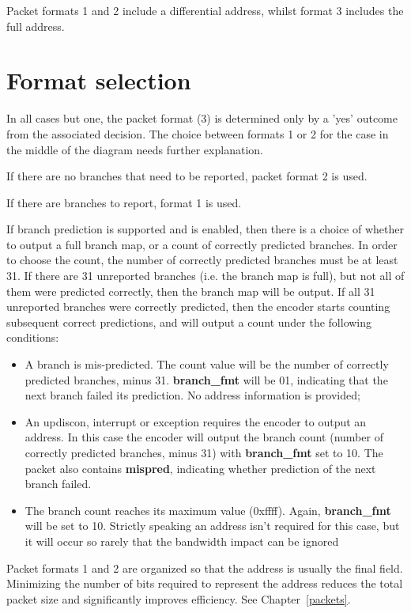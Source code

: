 Packet formats 1 and 2 include a differential address, whilst format 3 includes the full address.

\section{Format selection} \label{format-selection}

In all cases but one, the packet format (3) is determined only by a 'yes' outcome from the 
associated decision.  The choice between formats 1 or 2 for the case in the middle of the 
diagram needs further explanation.  

If there are no branches that need to be reported, packet format 2 is used.  

If there are branches to report, format 1 is used.

If branch prediction is supported and is enabled, then there is a choice of whether to output a 
full branch map, or a count of correctly predicted branches.  In order to choose the count, the number 
of correctly predicted branches must be at least 31.  If there are 31 unreported branches (i.e. the branch
map is full), but not all of them were predicted correctly, then the branch map will be output.
If all 31 unreported branches were correctly predicted, then the encoder starts counting
subsequent correct predictions, and will output a count under the following conditions:

\begin{itemize}
  \item A branch is mis-predicted.  The count value will be the number of correctly predicted branches, 
    minus 31.  \textbf{branch\_fmt} will be 01, indicating that the next branch failed its prediction.
   No address information is provided;
  \item An updiscon, interrupt or exception requires the encoder to output an address.  In this case 
    the encoder will output the branch count (number of correctly predicted branches, minus 31) with 
    \textbf{branch\_fmt} set to 10.  The packet also contains \textbf{mispred}, indicating whether 
    prediction of the next branch failed.
  \item The branch count reaches its maximum value (0xffff).  Again, \textbf{branch\_fmt} will be set to 10.
    Strictly speaking an address isn't required for this case, but it will occur so rarely that the bandwidth 
    impact can be ignored
\end{itemize}

Packet formats 1 and 2 are organized so that the address is usually the final field.  Minimizing the 
number of bits required to represent the address reduces the total packet size and significantly
improves efficiency.  See Chapter~\ref{packets}.

